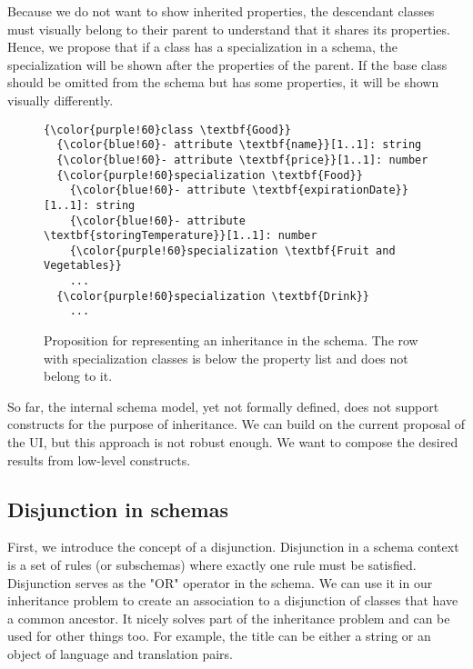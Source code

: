 \medskip

Because we do not want to show inherited properties, the descendant classes must visually belong to their parent to understand that it shares its properties. Hence, we propose that if a class has a specialization in a schema, the specialization will be shown after the properties of the parent. If the base class should be omitted from the schema but has some properties, it will be shown visually differently.

\begin{figure}[h!]\centering
  \begin{Verbatim}[commandchars=\\\{\}]
{\color{purple!60}class \textbf{Good}}
  {\color{blue!60}- attribute \textbf{name}}[1..1]: string
  {\color{blue!60}- attribute \textbf{price}}[1..1]: number
  {\color{purple!60}specialization \textbf{Food}}
    {\color{blue!60}- attribute \textbf{expirationDate}}[1..1]: string
    {\color{blue!60}- attribute \textbf{storingTemperature}}[1..1]: number
    {\color{purple!60}specialization \textbf{Fruit and Vegetables}}
    ...
  {\color{purple!60}specialization \textbf{Drink}}
    ...
\end{Verbatim}
  \caption{Proposition for representing an inheritance in the schema. The row with specialization classes is below the property list and does not belong to it.}
\end{figure}

So far, the internal schema model, yet not formally defined, does not support constructs for the purpose of inheritance. We can build on the current proposal of the UI, but this approach is not robust enough. We want to compose the desired results from low-level constructs.

\subsection*{Disjunction in schemas}

First, we introduce the concept of a disjunction. Disjunction in a schema context is a set of rules (or subschemas) where exactly one rule must be satisfied. Disjunction serves as the "OR" operator in the schema. We can use it in our inheritance problem to create an association to a disjunction of classes that have a common ancestor. It nicely solves part of the inheritance problem and can be used for other things too. For example, the title can be either a string or an object of language and translation pairs.

